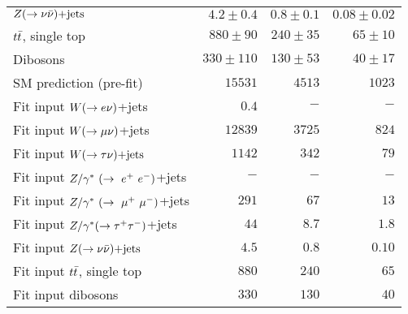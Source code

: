 \begin{table}[!ht]
\begin{center}
\begin{small}
\begin{tabular*}{\textwidth}{@{\extracolsep{\fill}}lrrr}
    $Z(\rightarrow \nu \bar{\nu})\text{+jets}$                             &  $4.2 \pm 0.4$             & $0.8 \pm 0.1$ & $0.08 \pm 0.02$  \\
                                                                                                     
    $t\bar{t}$, single top               &  $880 \pm 90$              & $240 \pm 35$  & $65 \pm 10$    \\
                                                                                                     
    Dibosons                           &  $330 \pm 110$             & $130 \pm 53$  & $40 \pm 17$      \\ \hline

    SM prediction (pre-fit)            &  $15531$  & $4513$ & $1023$ \\                      
    \hline                                                   
                                                                    
    Fit input $W(\rightarrow e \nu)$+jets                  &  $0.4$    & $-$    & $-$    \\
    Fit input $W(\rightarrow \mu \nu)$+jets                  &  $12839$  & $3725$ & $824$  \\
    Fit input $W(\rightarrow \tau \nu)\text{+jets}$                  &  $1142$   & $342$  & $79$   \\
    Fit input $Z/\gamma^*~(\rightarrow~e^+~e^-)$+jets                  &  $-$      & $-$    & $-$    \\
    Fit input $Z/\gamma^*~(\rightarrow~\mu^+~\mu^-)$+jets                  &  $291$    & $67$   & $13$   \\
    Fit input $Z/\gamma^*(\rightarrow \tau^+ \tau^-)$+jets                  &  $44$     & $8.7$  & $1.8$  \\
    Fit input $Z(\rightarrow \nu \bar{\nu})\text{+jets}$                  &  $4.5$    & $0.8$  & $0.10$ \\
    Fit input $t\bar{t}$, single top    &  $880$    & $240$  & $65$   \\
    Fit input dibosons                &  $330$    & $130$  & $40$   \\


\end{tabular*}
\end{small}
\end{center}
\end{table}
